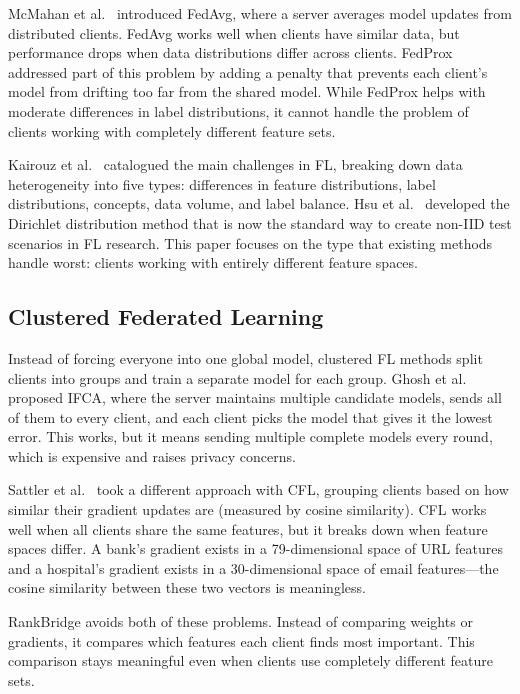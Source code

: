 \documentclass[information,article,submit,pdftex]{mdpi}
\begin{document}
McMahan et al.~\cite{mcmahan2017communication} introduced FedAvg, where a server
averages model updates from distributed clients. FedAvg works well when clients
have similar data, but performance drops when data distributions differ across
clients. FedProx~\cite{li2020fedprox} addressed part of this problem by adding a
penalty that prevents each client's model from drifting too far from the shared
model. While FedProx helps with moderate differences in label distributions, it
cannot handle the problem of clients working with completely different feature
sets.

Kairouz et al.~\cite{kairouz2021advances} catalogued the main challenges in FL,
breaking down data heterogeneity into five types: differences in feature
distributions, label distributions, concepts, data volume, and label balance. Hsu
et al.~\cite{hsu2019measuring} developed the Dirichlet distribution method that
is now the standard way to create non-IID test scenarios in FL research. This
paper focuses on the type that existing methods handle worst: clients working with
entirely different feature spaces.

\subsection{Clustered Federated Learning}

Instead of forcing everyone into one global model, clustered FL methods split
clients into groups and train a separate model for each group. Ghosh et
al.~\cite{ghosh2020ifca} proposed IFCA, where the server maintains multiple
candidate models, sends all of them to every client, and each client picks the
model that gives it the lowest error. This works, but it means sending multiple
complete models every round, which is expensive and raises privacy concerns.

Sattler et al.~\cite{sattler2021cfl} took a different approach with CFL, grouping
clients based on how similar their gradient updates are (measured by cosine
similarity). CFL works well when all clients share the same features, but it
breaks down when feature spaces differ. A bank's gradient exists in a
79-dimensional space of URL features and a hospital's gradient exists in a
30-dimensional space of email features---the cosine similarity between these two
vectors is meaningless.

RankBridge avoids both of these problems. Instead of comparing weights or
gradients, it compares which features each client finds most important. This
comparison stays meaningful even when clients use completely different feature
sets.
\end{document}
